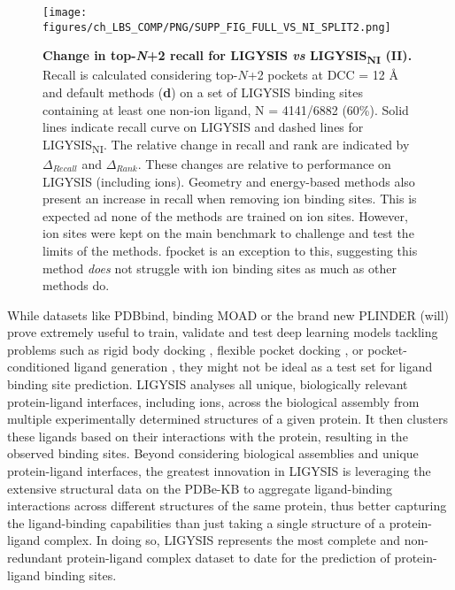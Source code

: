 \begin{figure}[htb!]
    \centering
    \texttt{[image: figures/ch\_LBS\_COMP/PNG/SUPP\_FIG\_FULL\_VS\_NI\_SPLIT2.png]}
   \caption[Change in top-\textit{N}+2 recall for LIGYSIS \textit{vs} LIGYSIS\textsubscript{NI} (II)]{\textbf{Change in top-\textit{N}+2 recall for LIGYSIS \textit{vs} LIGYSIS\textsubscript{NI} (II).} Recall is calculated considering top-$N$+2 pockets at DCC = 12 \AA{} and default methods (\textbf{d}) on a set of LIGYSIS binding sites containing at least one non-ion ligand, N = 4141/6882 (60\%). Solid lines indicate recall curve on LIGYSIS and dashed lines for LIGYSIS\textsubscript{NI}. The relative change in recall and rank are indicated by $\Delta_{Recall}$ and $\Delta_{Rank}$. These changes are relative to performance on LIGYSIS (including ions). Geometry and energy-based methods also present an increase in recall when removing ion binding sites. This is expected ad none of the methods are trained on ion sites. However, ion sites were kept on the main benchmark to challenge and test the limits of the methods. fpocket is an exception to this, suggesting this method \textit{does} not struggle with ion binding sites as much as other methods do.}
    \label{fig:LIGYSIS_VS_LIGYSISNI_2}
\end{figure}

While datasets like PDBbind, binding MOAD or the brand new PLINDER \cite{DURAIRAJ_2024_PLINDER} (will) prove extremely useful to train, validate and test deep learning models tackling problems such as rigid body docking \cite{STARK_2022_EQUIBIND}, flexible pocket docking \cite{QIAO_2024_DGN}, or pocket-conditioned ligand generation \cite{SCHNEUING_2023_DIFFUSION}, they might not be ideal as a test set for ligand binding site prediction. LIGYSIS analyses all unique, biologically relevant protein-ligand interfaces, including ions, across the biological assembly from multiple experimentally determined structures of a given protein. It then clusters these ligands based on their interactions with the protein, resulting in the observed binding sites. Beyond considering biological assemblies and unique protein-ligand interfaces, the greatest innovation in LIGYSIS is leveraging the extensive structural data on the PDBe-KB to aggregate ligand-binding interactions across different structures of the same protein, thus better capturing the ligand-binding capabilities than just taking a single structure of a protein-ligand complex. In doing so, LIGYSIS represents the most complete and non-redundant protein-ligand complex dataset to date for the prediction of protein-ligand binding sites.

